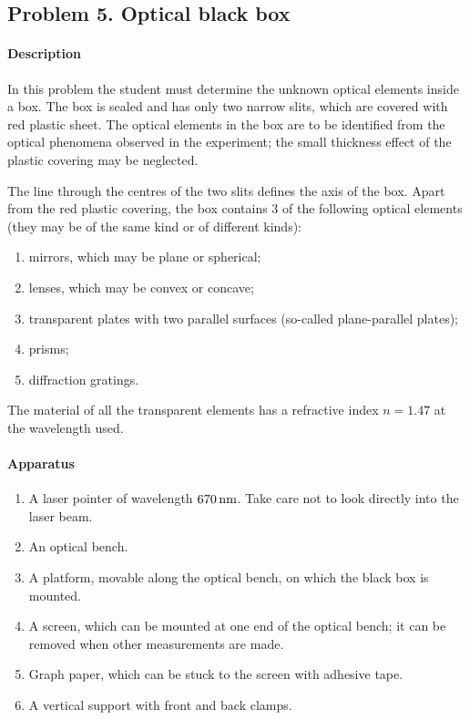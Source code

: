 \subsection*{Problem 5. Optical black box}

\paragraph{Description}

In this problem the student must determine the unknown optical elements inside a box. The box is sealed and has only two narrow slits, which are covered with red plastic sheet. The optical elements in the box are to be identified from the optical phenomena observed in the experiment; the small thickness effect of the plastic covering may be neglected.

The line through the centres of the two slits defines the axis of the box. Apart from the red plastic covering, the box contains 3 of the following optical elements (they may be of the same kind or of different kinds):
\begin{enumerate}[label=(\arabic*)]
\item mirrors, which may be plane or spherical;
\item lenses, which may be convex or concave;
\item transparent plates with two parallel surfaces (so-called plane-parallel plates);
\item prisms;
\item diffraction gratings.
\end{enumerate}
The material of all the transparent elements has a refractive index $n = 1.47$ at the wavelength used.

\paragraph{Apparatus}

\begin{enumerate}[label=(\arabic*)]
\item A laser pointer of wavelength $670\,\mathrm{nm}$. Take care not to look directly into the laser beam.
\item An optical bench.
\item A platform, movable along the optical bench, on which the black box is mounted.
\item A screen, which can be mounted at one end of the optical bench; it can be removed when other measurements are made.
\item Graph paper, which can be stuck to the screen with adhesive tape.
\item A vertical support with front and back clamps.
\end{enumerate}

